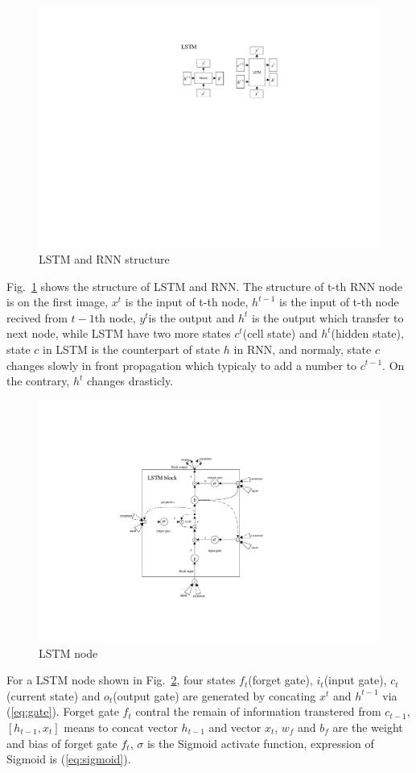 \documentclass[conference]{IEEEtran}
\begin{document}
\begin{figure}[htbp]
  \centerline{\includegraphics[width=0.7\linewidth]{figures/LSTM_struc.pdf}}
  \caption{LSTM and RNN structure}
  \label{fig:LSTM}
\end{figure}

  Fig.~\ref{fig:LSTM} shows the structure of LSTM and RNN. The structure of t-th RNN node is on the first image, $x^t$ is the input of t-th node, $h^{t-1}$ is the input of t-th node recived from $t-1$th node, $y^t$is the output and $h^t$ is the output which transfer to next node, while LSTM have two more states $c^t$(cell state) and $h^t$(hidden state), state $c$ in LSTM is the counterpart of state $h$ in RNN, and normaly, state $c$ changes slowly in front propagation which typicaly to add a number to $c^{t-1}$. On the contrary, $h^t$ changes drasticly.

\begin{figure}[htbp]
  \centerline{\includegraphics[width=0.7\linewidth]{figures/LSTM_node.pdf}}
  \caption{LSTM node}
  \label{fig:LSTM2}
\end{figure}

  For a LSTM node shown in Fig.~\ref{fig:LSTM2}, four states $f_t$(forget gate), $i_t$(input gate), $c_t$(current state) and $o_t$(output gate) are generated by concating $x^t$ and $h^{t-1}$ via (\ref{eq:gate}). Forget gate $f_t$ contral the remain of information transtered from $c_{t-1}$, $[h_{t-1}, x_t]$  means to concat vector $h_{t-1}$ and vector $x_t$, $w_f$ and $b_f$ are the weight and bias of forget gate $f_t$, $\sigma$ is the Sigmoid activate function, expression of Sigmoid is (\ref{eq:sigmoid}).
\end{document}
